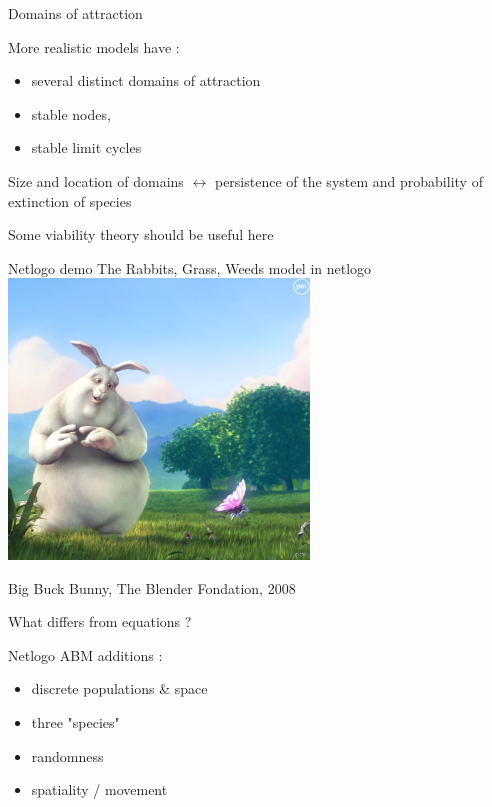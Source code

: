 \documentclass[11,aspectratio=1610]{beamer}
\begin{document}
\begin{frame}{Domains of attraction}


More realistic models have : 



\begin{itemize}
  \item  \alert{several distinct} domains of attraction 
  \item stable nodes,
  \item stable limit cycles
\end{itemize}


\vfill



\alert{Size} and \alert{location} of domains  $\leftrightarrow$ \alert{persistence} of the system and \alert{probability of extinction} of  species\\


\vfill


\tiny{Some viability theory should be useful here}


  
\end{frame}




\begin{frame}{Netlogo demo}
\vfill
The Rabbits, Grass, Weeds model in netlogo 
\vfill
\centering
\includegraphics[width=0.6\textwidth]{img/bunny.jpg}

\tiny{Big Buck Bunny, The Blender Fondation, 2008}

  
\end{frame}

\begin{frame}{What differs from equations ? }

Netlogo ABM additions :

\begin{itemize}
  \item discrete populations \& space
  \item three "species"
  \item randomness
  \item spatiality / movement 
\end{itemize}


\end{frame}
\end{document}
